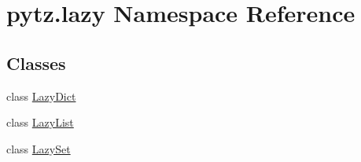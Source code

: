 \hypertarget{namespacepytz_1_1lazy}{}\section{pytz.\+lazy Namespace Reference}
\label{namespacepytz_1_1lazy}
\subsection*{Classes}
\begin{DoxyCompactItemize}
\item 
class \hyperlink{classpytz_1_1lazy_1_1LazyDict}{Lazy\+Dict}
\item 
class \hyperlink{classpytz_1_1lazy_1_1LazyList}{Lazy\+List}
\item 
class \hyperlink{classpytz_1_1lazy_1_1LazySet}{Lazy\+Set}
\end{DoxyCompactItemize}
